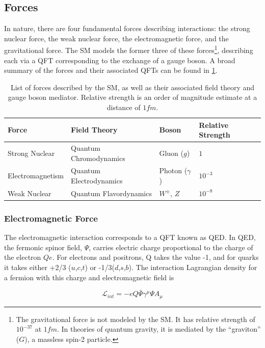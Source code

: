\subsection{Forces}
In nature, there are four fundamental forces describing interactions: the strong nuclear force, the weak nuclear force, the electromagnetic force, and the gravitational force. The \gls{SM} models the former three of these forces\footnote{The gravitational force is not modeled by the \gls{SM}. It has relative strength of $10^{-37}$ at $\unit{1}{fm}$. In theories of quantum gravity, it is mediated by the ``graviton'' ($G$), a massless spin-2 particle.}, describing each via a \gls{QFT} corresponding to the exchange of a gauge boson. A broad summary of the forces and their associated \glspl{QFT} can be found in \ref{tab:forces}.

\begin{table}[!ht]
    \begin{tabular}{l|l|l|l}
    Force & Field Theory & Boson & Relative Strength      \\ \hline
    Strong Nuclear   & Quantum Chromodynamics  & Gluon ($g$) & $1$ \\
    Electromagnetism & Quantum Electrodynamics & Photon ($\gamma$) & $10^{-3}$ \\
    Weak Nuclear     & Quantum Flavordynamics  & $W^{\pm}$, $Z$ & $10^{-8}$
    \end{tabular}
    \caption{List of forces described by the \gls{SM}, as well as their associated field theory and gauge boson mediator. Relative strength is an order of magnitude estimate at a distance of $\unit{1}{fm}$.}
    \label{tab:forces}
\end{table}

\subsubsection{Electromagnetic Force}
The electromagnetic interaction corresponds to a \gls{QFT} known as \gls{QED}. In \gls{QED}, the fermonic spinor field, $\Psi$, carries electric charge proportional to the charge of the electron $Qe$. For electrons and positrons, Q takes the value -1, and for quarks it takes either +2/3 ($u$,$c$,$t$) or -1/3($d$,$s$,$b$). The interaction Lagrangian density for a fermion with this charge and electromagnetic field is

\begin{equation}
    \mathcal{L}_{int} = -eQ\bar{\Psi}\gamma^{\mu}\Psi A_{\mu}
\end{equation}

